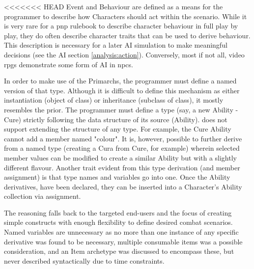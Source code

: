<<<<<<< HEAD
Event and Behaviour are defined as a means for the programmer to describe how Characters should act within the scenario. While it is very rare for a \ac{pnp} rulebook to describe character behaviour in full play by play, they do often describe character traits that can be used to derive behaviour. This description is necessary for a later AI simulation to make meaningful decisions (see the AI section \vref{analysis:action}). %
Conversely, most if not all, video \ac{rpgs} demonstrate some form of AI in \ac{npc}s.

In order to make use of the Primarchs, the programmer must define a named version of that type. Although it is difficult to define this mechanism as either instantiation (object of class) or inheritance (subclass of class), it mostly resembles the prior. The programmer must define a type (say, a new Ability - Cure) strictly following the data structure of its source (Ability). \langname{} does not support extending the structure of any type. For example, the Cure Ability cannot add a member named "colour". It is, however, possible to further derive from a named type (creating a Cura from Cure, for example) wherein selected member values can be modified to create a similar Ability but with a slightly different flavour. Another trait evident from this type derivation (and member assignment) is that type names and variables go into one. Once the Ability derivatives, have been declared, they can be inserted into a Character's Ability collection via assignment.

The reasoning falls back to the targeted end-users and the focus of creating simple constructs with enough flexibility to define desired combat scenarios. Named variables are unnecessary as no more than one instance of any specific derivative was found to be necessary, multiple consumable items was a possible consideration, and an Item archetype was discussed to encompass these, but never described syntactically due to time constraints.

